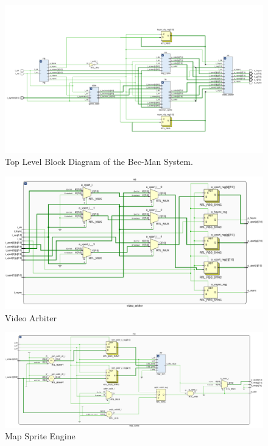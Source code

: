 \documentclass[12pt]{article}
\begin{document}
\begin{figure}
    \includegraphics[width=\textwidth]{TopLevelDiagram.png}
    \caption{Top Level Block Diagram of the Bec-Man System.}
    \label{fig:LandscapeFigure}
\end{figure}

\begin{figure}
    \includegraphics[width=\textwidth]{VideoArbiter.png}
    \caption{Video Arbiter}
    \label{fig:LandscapeFigure}
\end{figure}

\begin{figure}
    \includegraphics[width=\textwidth]{MapSprite.png}
    \caption{Map Sprite Engine}
    \label{fig:LandscapeFigure}
\end{figure}
\end{document}
